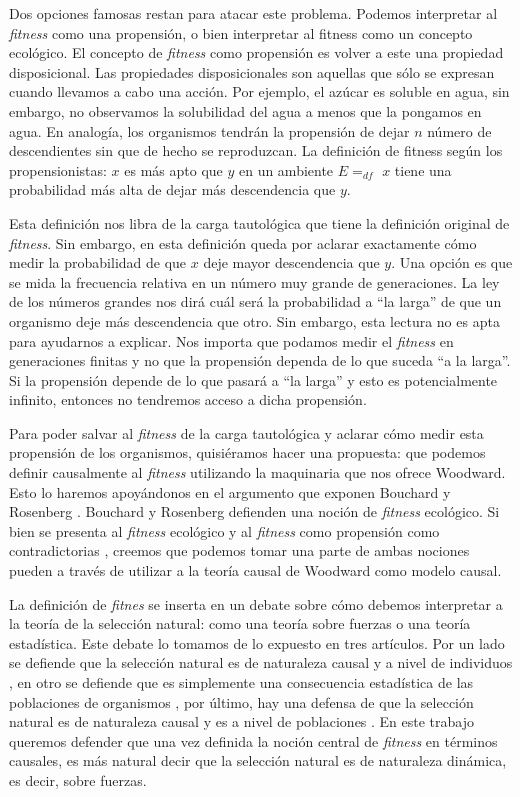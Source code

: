 Dos opciones famosas restan para atacar este problema. Podemos interpretar al \emph{fitness} como una propensión, o bien interpretar al fitness como un concepto ecológico. El concepto de \emph{fitness} como propensión es volver a este una propiedad disposicional. Las propiedades disposicionales son aquellas que sólo se expresan cuando llevamos a cabo una acción. Por ejemplo, el azúcar es soluble en agua, sin embargo, no observamos la solubilidad del agua a menos que la pongamos en agua. En analogía, los organismos tendrán la propensión de dejar $n$ número de descendientes sin que de hecho se reproduzcan. La definición de fitness según los propensionistas: $x$ es más apto que $y$ en un ambiente $E =_{df}$ $x$ tiene una probabilidad más alta de dejar más descendencia que $y$.

Esta definición nos libra de la carga tautológica que tiene la definición original de \emph{fitness}. Sin embargo, en esta definición queda por aclarar exactamente cómo medir la probabilidad de que $x$ deje mayor descendencia que $y$. Una opción es que se mida la frecuencia relativa en un número muy grande de generaciones. La ley de los números grandes nos dirá cuál será la probabilidad a ``la larga'' de que un organismo deje más descendencia que otro. Sin embargo, esta lectura no es apta para ayudarnos a explicar. Nos importa que podamos medir el \emph{fitness} en generaciones finitas y no que la propensión dependa de lo que suceda ``a la larga''. Si la propensión depende de lo que pasará a ``la larga'' y esto es potencialmente infinito, entonces no tendremos acceso a dicha propensión.

Para poder salvar al \emph{fitness} de la carga tautológica y aclarar cómo medir esta propensión de los organismos, quisiéramos hacer una propuesta: que podemos definir causalmente al \emph{fitness} utilizando la maquinaria que nos ofrece Woodward. Esto lo haremos apoyándonos en el argumento que exponen Bouchard y Rosenberg \cite{Bouchard2004}. Bouchard y Rosenberg defienden una noción de \emph{fitness} ecológico. Si bien se presenta al \emph{fitness} ecológico y al \emph{fitness} como propensión como contradictorias \cite{sep-fitness}, creemos que podemos tomar una parte de ambas nociones pueden a través de utilizar a la teoría causal de Woodward como modelo causal.

La definición de \emph{fitnes} se inserta en un debate sobre cómo debemos interpretar a la teoría de la selección natural: como una teoría sobre fuerzas o una teoría estadística. Este debate lo tomamos de lo expuesto en tres artículos. Por un lado se defiende que la selección natural es de naturaleza causal y a nivel de individuos \cite{Bouchard2004}, en otro se defiende que es simplemente una consecuencia estadística de las poblaciones de organismos \cite{Walsh2002}, por último, hay una defensa de que la selección natural es de naturaleza causal y es a nivel de poblaciones \cite{Millstein2006}. En este trabajo queremos defender que una vez definida la noción central de \emph{fitness} en términos causales, es más natural decir que la selección natural es de naturaleza dinámica, es decir, sobre fuerzas.

